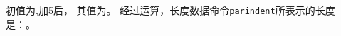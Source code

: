 \documentclass{book}
\begin{document}
\setcounter{mycounter}{2}
初值为\themycounter,加5后，%
其值为\themycounter。\setlength{\parindent}{10.5pt+3pt*5}%
经过运算，长度数据命令\verb"parindent"所表示的长度是：\the\parindent。
\end{document}
